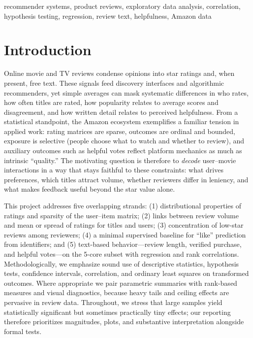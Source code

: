 \documentclass[conference]{IEEEtran}
\begin{document}
\begin{IEEEkeywords}
recommender systems, product reviews, exploratory data analysis, correlation, hypothesis testing, regression, review text, helpfulness, Amazon data
\end{IEEEkeywords}

\section{Introduction}
Online movie and TV reviews condense opinions into star ratings and, when present, free text. These signals feed discovery interfaces and algorithmic recommenders, yet simple averages can mask systematic differences in who rates, how often titles are rated, how popularity relates to average scores and disagreement, and how written detail relates to perceived helpfulness. From a statistical standpoint, the Amazon ecosystem exemplifies a familiar tension in applied work: rating matrices are sparse, outcomes are ordinal and bounded, exposure is selective (people choose what to watch and whether to review), and auxiliary outcomes such as helpful votes reflect platform mechanics as much as intrinsic ``quality.'' The motivating question is therefore to \emph{decode} user--movie interactions in a way that stays faithful to these constraints: what drives preferences, which titles attract volume, whether reviewers differ in leniency, and what makes feedback useful beyond the star value alone.

This project addresses five overlapping strands: (1) distributional properties of ratings and sparsity of the user--item matrix; (2) links between review volume and mean or spread of ratings for titles and users; (3) concentration of low-star reviews among reviewers; (4) a minimal supervised baseline for ``like'' prediction from identifiers; and (5) text-based behavior---review length, verified purchase, and helpful votes---on the 5-core subset with regression and rank correlations. Methodologically, we emphasize sound use of descriptive statistics, hypothesis tests, confidence intervals, correlation, and ordinary least squares on transformed outcomes. Where appropriate we pair parametric summaries with rank-based measures and visual diagnostics, because heavy tails and ceiling effects are pervasive in review data. Throughout, we stress that large samples yield statistically significant but sometimes practically tiny effects; our reporting therefore prioritizes magnitudes, plots, and substantive interpretation alongside formal tests.
\end{document}
